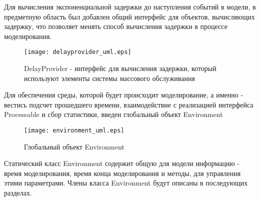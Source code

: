 Для вычисления экспоненциальной задержки до наступления событий в модели, в предметную область был добавлен общий интерфейс для объектов, вычисляющих задержку, что позволяет менять способ вычисления задержки в процессе моделирования.
\begin{figure}[H]
	\centering
	\texttt{[image: delayprovider\_uml.eps]}
	\caption{DelayProvider - интерфейс для вычисления задержки, который используют элементы системы массового обслуживания}
	\label{delayprovider_uml}
\end{figure}

Для обеспечения среды, которой будет происходит моделирование, а именно - вестись подсчет прошедшего времени, взаимодействие с реализацией интерфейса Processable и сбор статистики, введен глобальный объект Environment
\begin{figure}[H]
	\centering
	\texttt{[image: environment\_uml.eps]}
	\caption{Глобальный объект Environment}
	\label{environment_uml}
\end{figure}

Статический класс Environment содержит общую для модели информацию - время моделирования, время конца моделирования и методы, для управления этими параметрами. 
Члены класса Environment будут описаны в последующих разделах.

